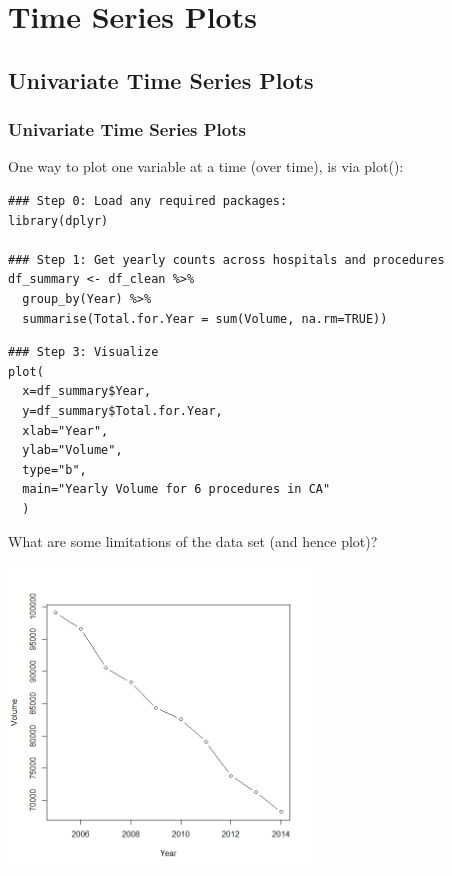 




\section[Time Series Plots]{Time Series Plots}

\subsection{Univariate Time Series Plots}

\begin{frame}
\frametitle{Univariate Time Series Plots}

One way to plot one variable at a time (over time), is via \ttfamily plot(): \normalfont 
		\begin{lstlisting}
### Step 0: Load any required packages:
library(dplyr)

### Step 1: Get yearly counts across hospitals and procedures
df_summary <- df_clean %>%
  group_by(Year) %>%
  summarise(Total.for.Year = sum(Volume, na.rm=TRUE))
  \end{lstlisting}

\newpage
  \begin{lstlisting}
### Step 3: Visualize
plot(
  x=df_summary$Year,
  y=df_summary$Total.for.Year,
  xlab="Year",
  ylab="Volume",
  type="b",
  main="Yearly Volume for 6 procedures in CA"
  )
		\end{lstlisting}
What are some limitations of the data set (and hence plot)?

\newpage
      \begin{center}
        \includegraphics[width=0.6\textwidth]{images/univar_ts.png}
       \end{center}

\end{frame}

